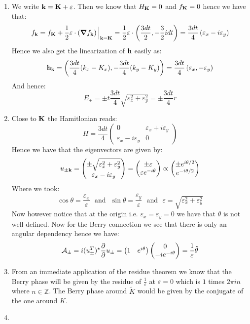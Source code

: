 \documentclass[10pt,a4paper]{article}
\begin{document}
\begin{enumerate}
\item We write $\vb{k} = \vb{K} + \vb{\varepsilon}$. Then we know that $H_{\vb{K}} = 0$ and $f_{\vb{K}} = 0$ hence we have that:
\[
f_{\vb{k}} = f_{\vb{K}}  + \frac{1}{2}\vb{\varepsilon} \cdot \left(\grad f_{\vb{k}} \right) \Big|_{\vb{k} = \vb{K}} = \frac{1}{2} \vb{\varepsilon} \cdot \left( \frac{3 d t}{2}, - \frac{3}{2} i d t  \right) = \frac{3dt}{4}\left( \varepsilon_x - i \varepsilon_y \right)
\] 
Hence we also get the linearization of $\vb{h}$ easily as:
\[
\vb{h}_{\vb{k}} = \left(\frac{3dt}{4} (k_x - K_x), -\frac{3 dt}{4} (k_y - K_y)\right)  = \frac{3 dt}{4}\left(\varepsilon_x, - \varepsilon_y \right)
\]
And hence:
\[
E_\pm = \pm t \frac{3 dt}{4} \sqrt{\varepsilon_x^2 + \varepsilon_y^2} = \pm \frac{3 d t}{4} r 
\]

\item Close to $\vb{K}$ the Hamitlonian reads:
\[
H = \frac{3 d t}{4}\begin{pmatrix}
0 & \varepsilon_x + i \varepsilon_y\\
\varepsilon_x - i \varepsilon_y & 0 
\end{pmatrix}
\]
Hence we have that the eigenvectors are given by:
\[
u_{\pm \vb{k}} = \begin{pmatrix}
\pm \sqrt{\varepsilon_x^2 + \varepsilon_y^2}\\
\varepsilon_x - i \varepsilon_y
\end{pmatrix} = \begin{pmatrix}
\pm \varepsilon\\
\varepsilon e^{-i \theta}
\end{pmatrix} \propto \begin{pmatrix}
\pm e^{i \theta/2}\\
e^{-i\theta/2}
\end{pmatrix}
\]
Where we took:
\[
\cos \theta = \frac{\varepsilon_x}{\varepsilon} \mbox{~~and~~} \sin \theta = \frac{\varepsilon_y}{\varepsilon} \mbox{~~and~~} \varepsilon = \sqrt{\varepsilon_x^2 + \varepsilon_y^2}
\]
Now however notice that at the origin i.e. $\varepsilon_x = \varepsilon_y = 0$ we have that $\theta$ is not well defined. Now for the Berry connection we see that there is only an angular dependency hence we have:
\[
\mathcal{A}_{\pm} = i (u_{\pm}^T)^\star \pdv{}{\vb{}} u_{\pm} = \begin{pmatrix}
1 & e^{i\theta}
\end{pmatrix} \begin{pmatrix}
0\\
-i e^{-i \theta}
\end{pmatrix} =  \frac{1}{\varepsilon} \vu{\theta} 
\]

\item From an immediate application of the residue theorem we know that the Berry phase will be given by the residue of $\frac{1}{\varepsilon}$ at $\varepsilon = 0$ which is $1$ times $2 \pi i n$ where $n \in \mathbb{Z}$. The Berry phase around $\tilde{K}$ would be given by the conjugate of the one around $K$. 

\item 



\end{enumerate}
\end{document}

